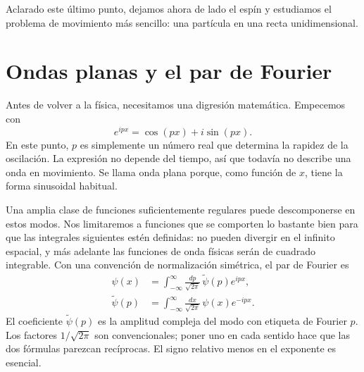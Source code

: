 \begin{classroomqa}\end{classroomqa}

Aclarado este último punto, dejamos ahora de lado el espín y estudiamos el problema de movimiento más sencillo: una partícula en una recta unidimensional.

\section{Ondas planas y el par de Fourier}

Antes de volver a la física, necesitamos una digresión matemática. Empecemos con
\begin{equation}
e^{ipx}=\cos(px)+i\sin(px).
\end{equation}
En este punto, \(p\) es simplemente un número real que determina la rapidez de la oscilación. La expresión no depende del tiempo, así que todavía no describe una onda en movimiento. Se llama onda plana porque, como función de \(x\), tiene la forma sinusoidal habitual.

Una amplia clase de funciones suficientemente regulares puede descomponerse en estos modos. Nos limitaremos a funciones que se comporten lo bastante bien para que las integrales siguientes estén definidas: no pueden divergir en el infinito espacial, y más adelante las funciones de onda físicas serán de cuadrado integrable. Con una convención de normalización simétrica, el par de Fourier es
\begin{align}
\psi(x)
&=
\int_{-\infty}^{\infty}
\frac{dp}{\sqrt{2\pi}}\,
\widetilde{\psi}(p)e^{ipx},
\label{eq:l9-fourier-forward}\\
\widetilde{\psi}(p)
&=
\int_{-\infty}^{\infty}
\frac{dx}{\sqrt{2\pi}}\,
\psi(x)e^{-ipx}.
\label{eq:l9-fourier-inverse}
\end{align}
El coeficiente \(\widetilde{\psi}(p)\) es la amplitud compleja del modo con etiqueta de Fourier \(p\). Los factores \(1/\sqrt{2\pi}\) son convencionales; poner uno en cada sentido hace que las dos fórmulas parezcan recíprocas. El signo relativo menos en el exponente es esencial.

